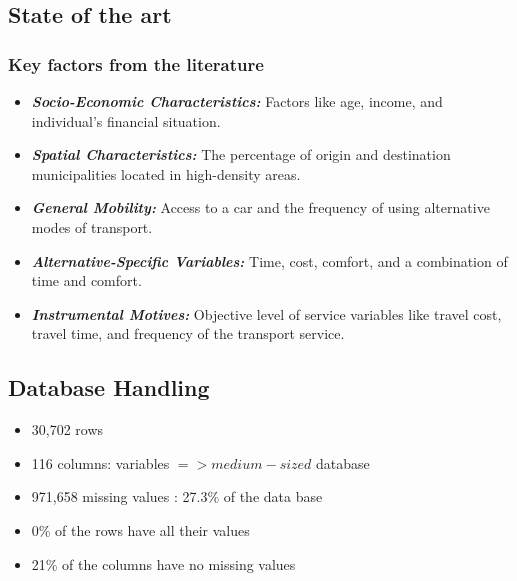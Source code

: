 \documentclass[
]{article}
\begin{document}
\newpage

\hypertarget{state-of-the-art-1}{%
\subsection{State of the art}\label{state-of-the-art-1}}

\hypertarget{key-factors-from-the-literature}{%
\subsubsection{Key factors from the
literature}\label{key-factors-from-the-literature}}

\begin{itemize}
\item
  \textbf{\emph{Socio-Economic Characteristics:}} Factors like age,
  income, and individual's financial situation.
\item
  \textbf{\emph{Spatial Characteristics:}} The percentage of origin and
  destination municipalities located in high-density areas.
\item
  \textbf{\emph{General Mobility:}} Access to a car and the frequency of
  using alternative modes of transport.
\item
  \textbf{\emph{Alternative-Specific Variables:}} Time, cost, comfort,
  and a combination of time and comfort.
\item
  \textbf{\emph{Instrumental Motives:}} Objective level of service
  variables like travel cost, travel time, and frequency of the
  transport service.
\end{itemize}

\hypertarget{database-handling}{%
\subsection{Database Handling}\label{database-handling}}

\begin{itemize}
\item
  30,702 rows
\item
  116 columns: variables \(=> medium-sized\) database
\item
  971,658 missing values : 27.3\% of the data base
\item
  0\% of the rows have all their values
\item
  21\% of the columns have no missing values
\end{itemize}

\newline
\end{document}
